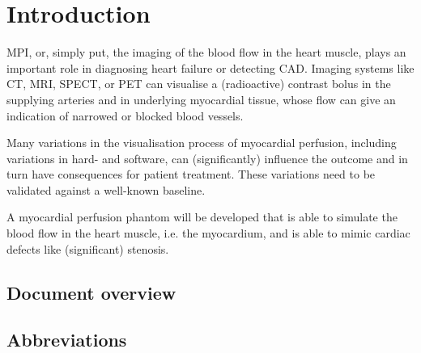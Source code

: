 \chapter{Introduction}
\label{ch:Intro}

\Ac{MPI}, or, simply put, the imaging of the blood flow in the heart muscle, plays an important role in diagnosing heart failure or detecting \ac{CAD}. Imaging systems like \ac{CT}, \ac{MRI}, \ac{SPECT}, or \ac{PET} can visualise a (radioactive) contrast bolus in the supplying arteries and in underlying myocardial tissue, whose flow can give an indication of narrowed or blocked blood vessels.

Many variations in the visualisation process of myocardial perfusion, including variations in hard- and software, can (significantly) influence the outcome and in turn have consequences for patient treatment. These variations need to be validated against a well-known baseline.

A myocardial perfusion phantom will be developed that is able to simulate the blood flow in the heart muscle, i.e. the myocardium, and is able to mimic cardiac defects like (significant) stenosis.

\section*{Document overview}
\label{sec:doc_overview}

\section*{Abbreviations}
\begin{multicols}{2}
	\printacronyms[include-classes=abbrev, name=Abbreviations, heading=none]
\end{multicols}